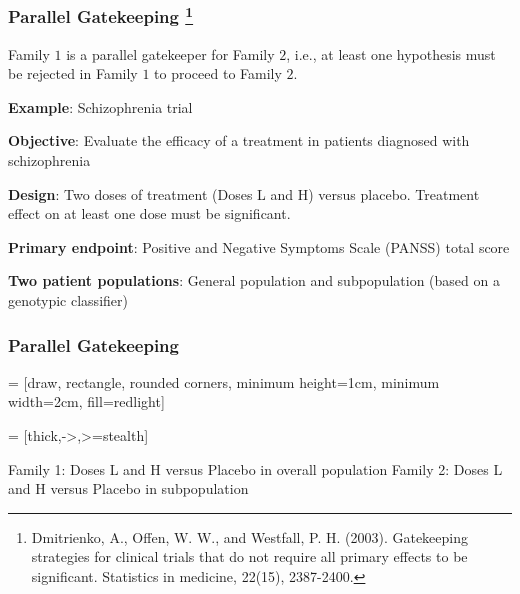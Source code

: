 \documentclass[xcolor={pdftex,dvipsnames,table}]{beamer}
\newcommand{\rbf}[1]{\textcolor{redUnipd}{ #1}}
\begin{document}
\begin{frame}
\frametitle{Parallel Gatekeeping \footnote{Dmitrienko, A., Offen, W. W., and Westfall, P. H. (2003). Gatekeeping strategies for clinical trials that do not require all primary effects to be significant. Statistics in medicine, 22(15), 2387-2400.}}

Family $1$ is a \rbf{parallel gatekeeper} for Family $2$, i.e., at least one hypothesis must be rejected in Family $1$ to proceed to Family $2$.

\bigskip

\rbf{\textbf{Example}}: Schizophrenia trial

\textbf{Objective}: Evaluate the efficacy of a treatment in patients diagnosed with schizophrenia

\textbf{Design}: Two doses of treatment (Doses L and H) versus placebo. Treatment effect on at least one dose must be
significant.

\textbf{Primary endpoint}: Positive and Negative Symptoms Scale (PANSS) total score

\textbf{Two patient populations}: General population and subpopulation (based on a genotypic classifier)
\end{frame}


\begin{frame}
\frametitle{Parallel Gatekeeping}
 = [draw, rectangle, rounded corners, minimum height=1cm, minimum width=2cm, fill=redlight]

 = [thick,->,>=stealth]

\begin{figure}
\centering

\end{figure}
Family 1: Doses L and H versus Placebo in overall
population
Family 2: Doses L and H versus Placebo in subpopulation
\end{frame}
\end{document}
